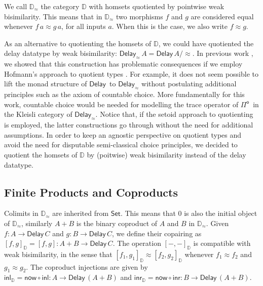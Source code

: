 \documentclass[runningheads,a4paper]{llncs}
\newcommand{\Pio}{\ensuremath{\mathsf{\Pi}^{\mathsf{o}}}}
\newcommand{\Set}{\mathsf{Set}}
\newcommand{\comp}{\circ}
\newcommand{\copair}[2]{[#1,#2]}
\newcommand{\inl}{\mathsf{inl}}
\newcommand{\inr}{\mathsf{inr}}
\newcommand{\Delay}{\ensuremath{\mathsf{Delay}\,}}
\newcommand{\now}{\mathsf{now}}
\newcommand{\D}{\mathbb{D}}
\newcommand{\Dapprox}{\mathbb{D}_{\approx}}
\newcommand{\copairD}[2]{[#1,#2]_{\D}}
\newcommand{\inlD}{\mathsf{inl}_{\D}}
\newcommand{\inrD}{\mathsf{inr}_{\D}}
\begin{document}
We call $\Dapprox$ the category $\D$ with homsets
quotiented by pointwise weak bisimilarity. This means that in
$\Dapprox$ two morphisms $f$ and $g$ are considered equal whenever
$f \, a \approx g \, a$, for all inputs $a$. When this is the case, we
also write $f \approx g$. 

As an alternative to quotienting the homsets of $\D$, we could have
quotiented the delay datatype by weak bisimilarity:
$\mathsf{Delay}_{\approx}\,A = \Delay A/{\approx}$. In previous work
\cite{ChapmanUV19}, we showed that this construction has problematic
consequences if we employ Hofmann's approach to quotient types
\cite{Hofmann}. For example, it does not seem possible to lift the
monad structure of $\Delay$ to $\mathsf{Delay}_{\approx}$ without
postulating additional principles such as the axiom of countable
choice. More fundamentally for this work, countable choice would be
needed for modelling the trace operator of \Pio\ in the Kleisli
category of $\mathsf{Delay}_{\approx}$. Notice that, if the setoid approach
to quotienting is employed, the latter constructions go through
without the need for additional assumptions. In order to keep an
agnostic perspective on quotient types and avoid the need for
disputable semi-classical choice principles, we decided to quotient
the homsets of $\D$ by (poitwise) weak bisimilarity instead of the
delay datatype.

\subsection{Finite Products and Coproducts}
\label{sec:prod}

Colimits in $\Dapprox$ are inherited from $\Set$. This means that 0 is
also the initial object of $\Dapprox$, similarly $A + B$ is the
binary coproduct of $A$ and $B$ in $\Dapprox$. Given $f : A \to
\Delay C$ and $g : B \to \Delay C$, we define their copairing as
$\copairD f g = \copair f g : A + B \to \Delay C$. The operation
$\copairD - -$ is compatible with weak bisimilarity, in the sense that
$\copairD{f_1}{g_1} \approx \copairD{f_2}{g_2}$ whenever $f_1 \approx f_2$
and $g_1 \approx g_2$.
The coproduct
injections are given by $\inlD = \now \comp \inl : A \to \Delay (A +
B)$ and $\inrD = \now \comp \inr : B \to \Delay (A + B)$.
\end{document}
